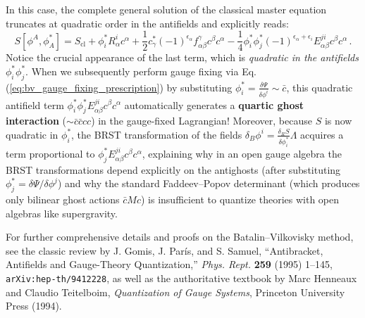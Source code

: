 In this case, the complete general solution of the classical master equation truncates at quadratic order in the antifields and explicitly reads:
\begin{equation} \label{eq:bv_open_algebra_full_solution}
    \boxed{S[\phi^A, \phi_A^*] = S_{\text{cl}} + \phi_i^* R^i_\alpha c^\alpha + \frac{1}{2} c_\gamma^* (-1)^{\epsilon_\alpha} f^\gamma_{\alpha\beta} c^\beta c^\alpha - \frac{1}{4} \phi_i^* \phi_j^* (-1)^{\epsilon_\alpha + \epsilon_i} E^{ji}_{\alpha\beta} c^\beta c^\alpha} \, .
\end{equation}
Notice the crucial appearance of the last term, which is \textit{quadratic in the antifields} \(\phi_i^* \phi_j^*\). When we subsequently perform gauge fixing via Eq. (\ref{eq:bv_gauge_fixing_prescription}) by substituting \(\phi_i^* = \frac{\delta \Psi}{\delta \phi^i} \sim \bar{c}\), this quadratic antifield term \(\phi_i^* \phi_j^* E^{ji}_{\alpha\beta} c^\beta c^\alpha\) automatically generates a \textbf{quartic ghost interaction} (\(\sim \bar{c} \bar{c} c c\)) in the gauge-fixed Lagrangian! Moreover, because \(S\) is now quadratic in \(\phi_i^*\), the BRST transformation of the fields \(\delta_B \phi^i = \frac{\delta_R S}{\delta \phi_i^*} \Lambda\) acquires a term proportional to \(\phi_j^* E^{ji}_{\alpha\beta} c^\beta c^\alpha\), explaining why in an open gauge algebra the BRST transformations depend explicitly on the antighosts (after substituting \(\phi_j^* = \delta\Psi / \delta\phi^j\)) and why the standard Faddeev--Popov determinant (which produces only bilinear ghost actions \(\bar{c} M c\)) is insufficient to quantize theories with open algebras like supergravity.

For further comprehensive details and proofs on the Batalin--Vilkovisky method, see the classic review by J. Gomis, J. París, and S. Samuel, ``Antibracket, Antifields and Gauge-Theory Quantization,'' \textit{Phys. Rept.} \textbf{259} (1995) 1--145, \texttt{arXiv:hep-th/9412228}, as well as the authoritative textbook by Marc Henneaux and Claudio Teitelboim, \textit{Quantization of Gauge Systems}, Princeton University Press (1994).